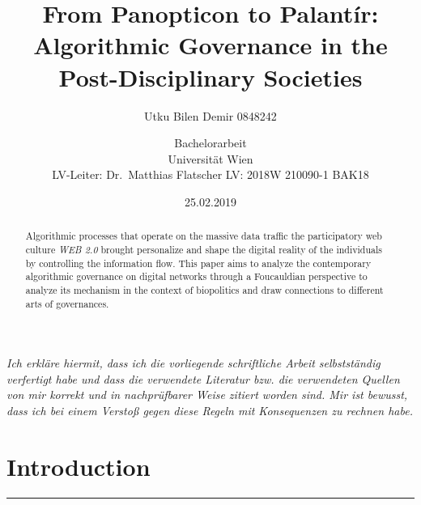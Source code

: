 \documentclass[12pt,twoside]{report}
\title{From Panopticon to Palantír: Algorithmic Governance in the Post-Disciplinary Societies}
\subtitle{Utku Bilen Demir \textbar{} 0848242}
\author{Bachelorarbeit \\ Universität Wien \\ LV-Leiter: Dr.~Matthias Flatscher \textbar{} LV: 2018W 210090-1 BAK18}
\date{25.02.2019}
\begin{document}
\maketitle
\begin{abstract}
Algorithmic processes that operate on the massive data traffic the participatory web culture \emph{WEB 2.0} brought personalize and shape the digital reality of the individuals by controlling the information flow. This paper aims to analyze the contemporary algorithmic governance on digital networks through a Foucauldian perspective to analyze its mechanism in the context of biopolitics and draw connections to different arts of governances.
\end{abstract}

{
\hypersetup{linkcolor=black}
\setcounter{tocdepth}{5}
\tableofcontents
}
\listoftables
\listoffigures
\newpage

\pagebreak
\hspace{2pt}
\vfill

\emph{Ich erkläre hiermit, dass ich die vorliegende schriftliche Arbeit selbstständig verfertigt habe und dass die verwendete Literatur bzw. die verwendeten Quellen von mir korrekt und in nachprüfbarer Weise zitiert worden sind. Mir ist bewusst, dass ich bei einem Verstoß gegen diese Regeln mit Konsequenzen zu rechnen habe.}
\vfill
\hspace{2pt}
\pagebreak

\hypertarget{introduction}{%
\chapter{Introduction}\label{introduction}}

\begin{center}\rule{0.5\linewidth}{\linethickness}\end{center}
\end{document}
